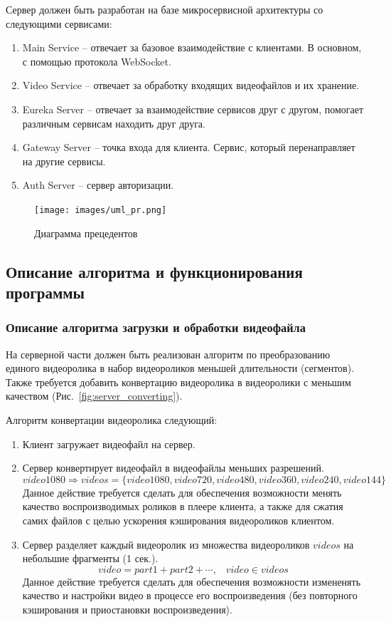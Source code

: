 \documentclass{../includes/TechDoc}
\begin{document}
    Сервер должен быть разработан на базе микросервисной архитектуры со следующими сервисами:

    \begin{enumerate}
        \item Main Service -- отвечает за базовое взаимодействие с клиентами. В основном, с помощью протокола WebSocket.
        \item Video Service -- отвечает за обработку входящих видеофайлов и их хранение.
        \item Eureka Server -- отвечает за взаимодействие сервисов друг с другом, помогает различным сервисам находить друг друга.
        \item Gateway Server -- точка входа для клиента. Сервис, который перенаправляет на другие сервисы.
        \item Auth Server -- сервер авторизации.
    \end{enumerate}

    \begin{figure}[h]
        \centering
        \texttt{[image: images/uml\_pr.png]}
        \caption{Диаграмма прецедентов}
        \label{fig:uml_pr}
    \end{figure}

    \newpage

    \subsection{Описание алгоритма и функционирования программы}

    \subsubsection{Описание алгоритма загрузки и обработки видеофайла}

    На серверной части должен быть реализован алгоритм по преобразованию единого видеоролика в набор видеороликов меньшей длительности (сегментов).
	Также требуется добавить конвертацию видеоролика в видеоролики с меньшим качеством (Рис.~\ref{fig:server_converting}).

	Алгоритм конвертации видеоролика следующий:
	\begin{enumerate}
	    \item Клиент загружает видеофайл на сервер.
	    \item Сервер конвертирует видеофайл в видеофайлы меньших разрешений.
	    \[ video1080 \Rightarrow videos = \{ video1080, video720, video480, video360, video240, video144 \} \]
	    Данное действие требуется сделать для обеспечения возможности менять качество воспроизводимых роликов в плеере клиента,
	    а также для сжатия самих файлов с целью ускорения кэширования видеороликов клиентом.
	    \item Сервер разделяет каждый видеоролик из множества видеороликов \(videos\) на небольшие фрагменты (1 сек.).
	    \[ video = part1 + part2 + \cdots, \;\;\; video \in videos \]
	    Данное действие требуется сделать для обеспечения возможности измененять качество и настройки видео в процессе его воспроизведения
	    (без повторного кэширования и приостановки воспроизведения).
	\end{enumerate}
\end{document}
